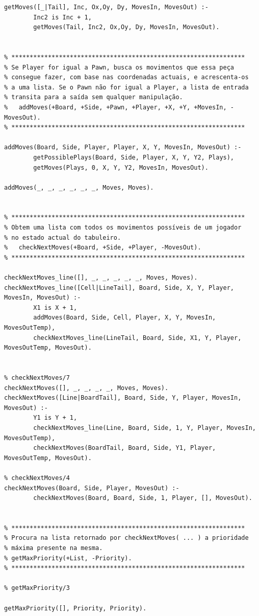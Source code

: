 \documentclass[15pt,a4paper]{article}
\begin{document}
\begin{lstlisting}
getMoves([_|Tail], Inc, Ox,Oy, Dy, MovesIn, MovesOut) :-
		Inc2 is Inc + 1,
		getMoves(Tail, Inc2, Ox,Oy, Dy, MovesIn, MovesOut).
		
		
% ****************************************************************
% Se Player for igual a Pawn, busca os movimentos que essa peça
% consegue fazer, com base nas coordenadas actuais, e acrescenta-os
% a uma lista. Se o Pawn não for igual a Player, a lista de entrada
% transita para a saída sem qualquer manipulação.
%	addMoves(+Board, +Side, +Pawn, +Player, +X, +Y, +MovesIn, -MovesOut).
% ****************************************************************
	
addMoves(Board, Side, Player, Player, X, Y, MovesIn, MovesOut) :-
		getPossiblePlays(Board, Side, Player, X, Y, Y2, Plays),
		getMoves(Plays, 0, X, Y, Y2, MovesIn, MovesOut).

addMoves(_, _, _, _, _, _, Moves, Moves).		


% ****************************************************************
% Obtem uma lista com todos os movimentos possíveis de um jogador
% no estado actual do tabuleiro.
%	checkNextMoves(+Board, +Side, +Player, -MovesOut).
% ****************************************************************

checkNextMoves_line([], _, _, _, _, _, Moves, Moves).
checkNextMoves_line([Cell|LineTail], Board, Side, X, Y, Player, MovesIn, MovesOut) :-
		X1 is X + 1,
		addMoves(Board, Side, Cell, Player, X, Y, MovesIn, MovesOutTemp),
		checkNextMoves_line(LineTail, Board, Side, X1, Y, Player, MovesOutTemp, MovesOut).
	

% checkNextMoves/7
checkNextMoves([], _, _, _, _, Moves, Moves).
checkNextMoves([Line|BoardTail], Board, Side, Y, Player, MovesIn, MovesOut) :-
		Y1 is Y + 1,
		checkNextMoves_line(Line, Board, Side, 1, Y, Player, MovesIn, MovesOutTemp),
		checkNextMoves(BoardTail, Board, Side, Y1, Player, MovesOutTemp, MovesOut).

% checkNextMoves/4
checkNextMoves(Board, Side, Player, MovesOut) :-
		checkNextMoves(Board, Board, Side, 1, Player, [], MovesOut).


% ****************************************************************
% Procura na lista retornado por checkNextMoves( ... ) a prioridade
% máxima presente na mesma.
% getMaxPriority(+List, -Priority).
% ****************************************************************

% getMaxPriority/3

getMaxPriority([], Priority, Priority).


\end{lstlisting}
\end{document}
